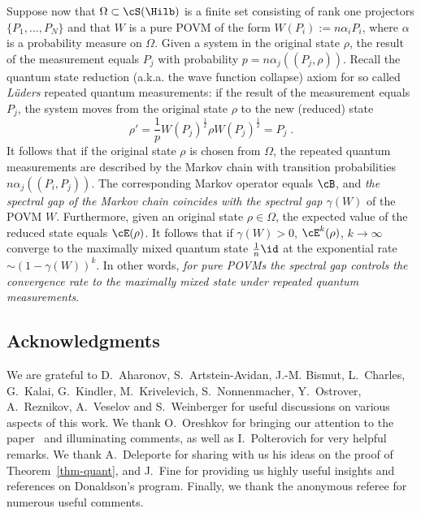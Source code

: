 
Suppose now that $\Omega \subset \cS(\Hilb)$ is a finite set consisting of rank one projectors $\{P_1,\dots, P_N\}$ and that $W$ is a pure POVM of the form $W(P_i) := n\alpha_i P_i$, where $\alpha$ is a probability measure on $\Omega$. Given a system in the original state $\rho$, the result of the measurement equals $P_j$ with probability $p= n\alpha_j((P_j,\rho))$. Recall the quantum state reduction (a.k.a. the wave function collapse) axiom for so called \emph{Lüders} repeated quantum measurements: if the result of the measurement equals $P_j$, the system moves from the original state $\rho$ to the new (reduced) state
\[
\rho' = \frac{1}{p} W(P_j)^{\frac{1}{2}}\rho W(P_j)^{\frac{1}{2}}= P_j\;.
\]
It follows that if the original state $\rho$ is chosen from $\Omega$, the repeated quantum measurements are described by the Markov chain with transition probabilities $n\alpha_j((P_i,P_j))$. The corresponding Markov operator equals $\cB$, and \emph{the spectral gap of the Markov chain coincides with the spectral gap $\gamma(W)$} of the POVM $W$. Furthermore, given an original state $\rho \in \Omega$, the expected value of the reduced state equals $\cE(\rho)$. It follows that if $\gamma(W)>0$, $\cE^k(\rho)$, $k \to \infty$ converge to the maximally mixed quantum state $\frac{1}{n}\id$ at the exponential rate $\sim (1-\gamma(W))^k$. In other words, \emph{for pure POVMs the spectral gap controls the convergence rate to the maximally mixed state under repeated quantum measurements}.



\subsection*{Acknowledgments}
We are grateful to D.~Aharonov, S.~Artstein-Avidan, J.-M. Bismut, L.~Charles, G.~Kalai, G.~Kindler, M.~Krivelevich, S.~Nonnenmacher, Y.~Ostrover, A.~Reznikov, A.~Veselov and S.~Weinberger for useful discussions on various aspects of this work. We thank O.~Oreshkov for bringing our attention to the paper~\cite{OC} and illuminating comments, as well as I.~Polterovich for very helpful remarks. We thank A.~Deleporte for sharing with us his ideas on the proof of Theorem~\ref{thm-quant}, and J.~Fine for providing us highly useful insights and references on Donaldson's program. Finally, we thank the anonymous referee for numerous useful comments.


